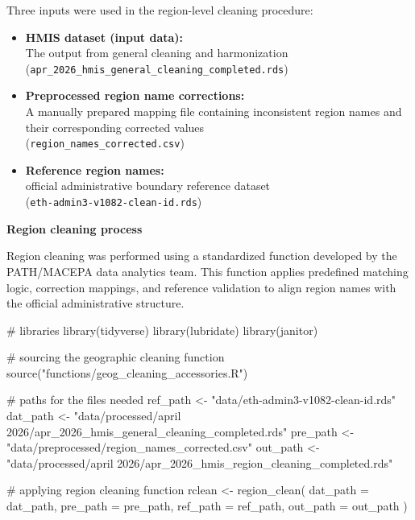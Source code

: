 \documentclass[
  letterpaper,
  DIV=11,
  numbers=noendperiod]{scrartcl}
\newenvironment{Shaded}{\begin{snugshade}}{\end{snugshade}}
\newcommand{\AttributeTok}[1]{\textcolor[rgb]{0.40,0.45,0.13}{#1}}
\newcommand{\CommentTok}[1]{\textcolor[rgb]{0.37,0.37,0.37}{#1}}
\newcommand{\FunctionTok}[1]{\textcolor[rgb]{0.28,0.35,0.67}{#1}}
\newcommand{\NormalTok}[1]{\textcolor[rgb]{0.00,0.23,0.31}{#1}}
\newcommand{\OtherTok}[1]{\textcolor[rgb]{0.00,0.23,0.31}{#1}}
\newcommand{\StringTok}[1]{\textcolor[rgb]{0.13,0.47,0.30}{#1}}
\begin{document}
Three inputs were used in the region-level cleaning procedure:

\begin{itemize}
\item
  \textbf{HMIS dataset (input data):}\\
  The output from general cleaning and harmonization\\
  (\texttt{apr\_2026\_hmis\_general\_cleaning\_completed.rds})
\item
  \textbf{Preprocessed region name corrections:}\\
  A manually prepared mapping file containing inconsistent region names
  and their corresponding corrected values\\
  (\texttt{region\_names\_corrected.csv})
\item
  \textbf{Reference region names:}\\
  official administrative boundary reference dataset\\
  (\texttt{eth-admin3-v1082-clean-id.rds})
\end{itemize}

\textbf{Region cleaning process}

Region cleaning was performed using a standardized function developed by
the PATH/MACEPA data analytics team. This function applies predefined
matching logic, correction mappings, and reference validation to align
region names with the official administrative structure.

\begin{Shaded}
\begin{Highlighting}[]
\CommentTok{\# libraries}
\FunctionTok{library}\NormalTok{(tidyverse)}
\FunctionTok{library}\NormalTok{(lubridate)}
\FunctionTok{library}\NormalTok{(janitor)}

\CommentTok{\# sourcing the geographic cleaning function}
\FunctionTok{source}\NormalTok{(}\StringTok{"functions/geog\_cleaning\_accessories.R"}\NormalTok{)}

\CommentTok{\# paths for the files needed }
\NormalTok{ref\_path }\OtherTok{\textless{}{-}} \StringTok{"data/eth{-}admin3{-}v1082{-}clean{-}id.rds"}
\NormalTok{dat\_path }\OtherTok{\textless{}{-}} \StringTok{"data/processed/april 2026/apr\_2026\_hmis\_general\_cleaning\_completed.rds"}
\NormalTok{pre\_path }\OtherTok{\textless{}{-}} \StringTok{"data/preprocessed/region\_names\_corrected.csv"}
\NormalTok{out\_path }\OtherTok{\textless{}{-}} \StringTok{"data/processed/april 2026/apr\_2026\_hmis\_region\_cleaning\_completed.rds"}

\CommentTok{\# applying region cleaning function}
\NormalTok{rclean }\OtherTok{\textless{}{-}} \FunctionTok{region\_clean}\NormalTok{(}
  \AttributeTok{dat\_path =}\NormalTok{ dat\_path,}
  \AttributeTok{pre\_path =}\NormalTok{ pre\_path,}
  \AttributeTok{ref\_path =}\NormalTok{ ref\_path,}
  \AttributeTok{out\_path =}\NormalTok{ out\_path}
\NormalTok{)}
\end{Highlighting}
\end{Shaded}
\end{document}
